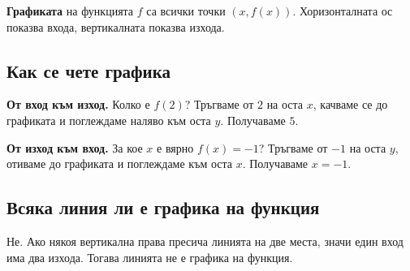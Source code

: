 \documentclass[11pt,a4paper]{article}
\begin{document}
\begin{defbox}
\textbf{Графиката} на функцията $f$ са всички точки $(x, f(x))$.
Хоризонталната ос показва входа, вертикалната показва изхода.
\end{defbox}

\subsection{Как се чете графика}

\begin{minipage}[c]{0.47\textwidth}
\end{minipage}\hfill
\begin{minipage}[c]{0.5\textwidth}
\textbf{\textcolor{corange}{От вход към изход.}} Колко е $f(2)$?
Тръгваме от $2$ на оста $x$, качваме се до графиката и поглеждаме наляво към оста $y$. Получаваме $5$.

\vspace{6pt}
\textbf{\textcolor{cgreen}{От изход към вход.}} За кое $x$ е вярно $f(x)=-1$?
Тръгваме от $-1$ на оста $y$, отиваме до графиката и поглеждаме към оста $x$. Получаваме $x=-1$.
\end{minipage}

\subsection{Всяка линия ли е графика на функция}

Не. Ако някоя вертикална права пресича линията на две места, значи един вход има два изхода. Тогава линията не е графика на функция.
\end{document}
